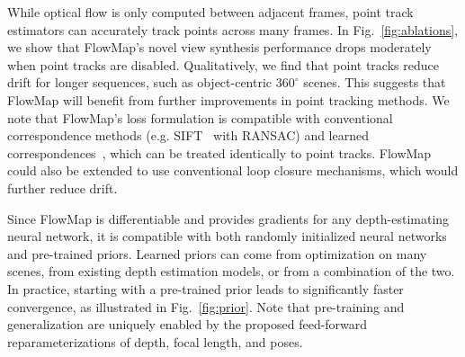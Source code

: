\label{point_track_exp}
While optical flow is only computed between adjacent frames, point track estimators can accurately track points across many frames. 
In Fig.~\ref{fig:ablations}, we show that FlowMap's novel view synthesis performance drops moderately when point tracks are disabled.
Qualitatively, we find that point tracks reduce drift for longer sequences, such as object-centric $360^\circ$ scenes.
This suggests that FlowMap will benefit from further improvements in point tracking methods.
We note that FlowMap's loss formulation is compatible with conventional correspondence methods (e.g. SIFT~\cite{sift} with RANSAC) and learned correspondences~\cite{sarlin20superglue}, which can be treated identically to point tracks.
FlowMap could also be extended to use conventional loop closure mechanisms, which would further reduce drift.


Since FlowMap is differentiable and provides gradients for any depth-estimating neural network, it is compatible with both randomly initialized neural networks and pre-trained priors.
Learned priors can come from optimization on many scenes, from existing depth estimation models, or from a combination of the two.
In practice, starting with a pre-trained prior leads to significantly faster convergence, as illustrated in Fig.~\ref{fig:prior}.
Note that pre-training and generalization are uniquely enabled by the proposed feed-forward reparameterizations of depth, focal length, and poses.
